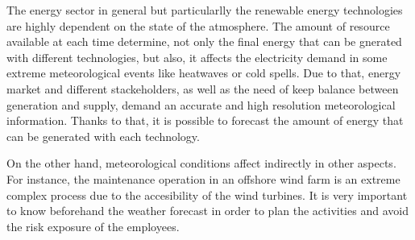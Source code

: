
The energy sector in general but particularlly the renewable energy technologies are highly dependent on the state of the atmosphere. The amount of resource available at each time determine, not only the final energy that can be gnerated with different technologies, but also, it affects the electricity demand in some extreme meteorological events like heatwaves or cold spells. Due to that, energy market and different stackeholders, as well as the need of keep balance between generation and supply, demand an accurate and high resolution meteorological information. Thanks to that, it is possible to forecast the amount of energy that can be generated with each technology. 


On the other hand, meteorological conditions affect indirectly in other aspects. For instance, the maintenance operation in an offshore wind farm is an extreme complex process due to the accesibility of the wind turbines. It is very important to know beforehand the weather forecast in order to plan the activities and avoid the risk exposure of the employees.


